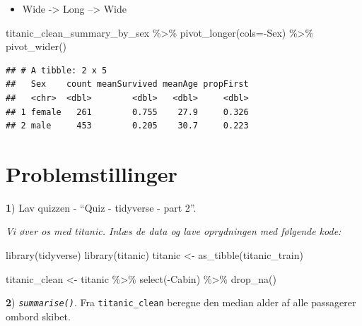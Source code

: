 \documentclass[
]{book}
\newenvironment{Shaded}{\begin{snugshade}}{\end{snugshade}}
\newcommand{\AttributeTok}[1]{\textcolor[rgb]{0.77,0.63,0.00}{#1}}
\newcommand{\FunctionTok}[1]{\textcolor[rgb]{0.00,0.00,0.00}{#1}}
\newcommand{\NormalTok}[1]{#1}
\newcommand{\OtherTok}[1]{\textcolor[rgb]{0.56,0.35,0.01}{#1}}
\newcommand{\SpecialCharTok}[1]{\textcolor[rgb]{0.00,0.00,0.00}{#1}}
\providecommand{\tightlist}{%
  \setlength{\itemsep}{0pt}\setlength{\parskip}{0pt}}
\begin{document}
\begin{itemize}
\tightlist
\item
  Wide -\textgreater{} Long --\textgreater{} Wide
\end{itemize}

\begin{Shaded}
\begin{Highlighting}[]
\NormalTok{titanic\_clean\_summary\_by\_sex }\SpecialCharTok{\%\textgreater{}\%} 
  \FunctionTok{pivot\_longer}\NormalTok{(}\AttributeTok{cols=}\SpecialCharTok{{-}}\NormalTok{Sex)  }\SpecialCharTok{\%\textgreater{}\%}
  \FunctionTok{pivot\_wider}\NormalTok{()}
\end{Highlighting}
\end{Shaded}

\begin{verbatim}
## # A tibble: 2 x 5
##   Sex    count meanSurvived meanAge propFirst
##   <chr>  <dbl>        <dbl>   <dbl>     <dbl>
## 1 female   261        0.755    27.9     0.326
## 2 male     453        0.205    30.7     0.223
\end{verbatim}

\hypertarget{problemstillinger-5}{%
\section{Problemstillinger}\label{problemstillinger-5}}

\textbf{1}) Lav quizzen - ``Quiz - tidyverse - part 2''.

\emph{Vi øver os med titanic. Inlæs de data og lave oprydningen med følgende kode:}

\begin{Shaded}
\begin{Highlighting}[]
\FunctionTok{library}\NormalTok{(tidyverse)}
\FunctionTok{library}\NormalTok{(titanic)}
\NormalTok{titanic }\OtherTok{\textless{}{-}} \FunctionTok{as\_tibble}\NormalTok{(titanic\_train)}

\NormalTok{titanic\_clean }\OtherTok{\textless{}{-}}\NormalTok{ titanic }\SpecialCharTok{\%\textgreater{}\%} 
    \FunctionTok{select}\NormalTok{(}\SpecialCharTok{{-}}\NormalTok{Cabin) }\SpecialCharTok{\%\textgreater{}\%} 
    \FunctionTok{drop\_na}\NormalTok{()}
\end{Highlighting}
\end{Shaded}

\textbf{2}) \emph{\texttt{summarise()}}. Fra \texttt{titanic\_clean} beregne den median alder af alle passagerer ombord skibet.
\end{document}
